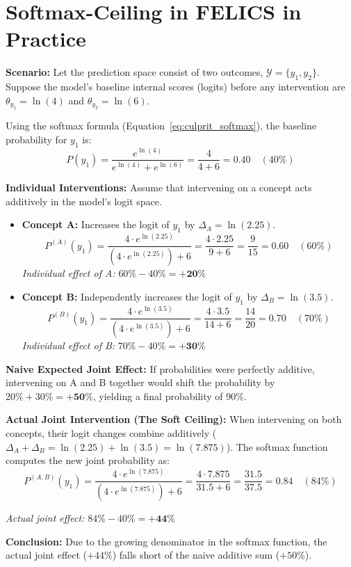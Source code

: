 \section*{Softmax-Ceiling in FELICS in Practice}
\begin{example_box}[label=ex:softmax_ceiling_unused]
    \textbf{Scenario:} Let the prediction space consist of two outcomes, $\mathcal{Y} = \{y_1, y_2\}$. Suppose the model's baseline internal scores (logits) before any intervention are $\theta_{y_1} = \ln(4)$ and $\theta_{y_2} = \ln(6)$.

    Using the softmax formula (Equation~\ref{eq:culprit_softmax}), the baseline probability for $y_1$ is:
    \begin{equation} P(y_1) = \frac{e^{\ln(4)}}{e^{\ln(4)} + e^{\ln(6)}} = \frac{4}{4 + 6} = 0.40 \quad (40\%) \end{equation}

    \smallskip
    \textbf{Individual Interventions:}
    Assume that intervening on a concept acts additively in the model's logit space.
    \begin{itemize}
        \item \textbf{Concept A:} Increases the logit of $y_1$ by $\Delta_A = \ln(2.25)$.
              \begin{equation} P^{(A)}(y_1) = \frac{4 \cdot e^{\ln(2.25)}}{(4 \cdot e^{\ln(2.25)}) + 6} = \frac{4 \cdot 2.25}{9 + 6} = \frac{9}{15} = 0.60 \quad (60\%) \end{equation}
              \emph{Individual effect of A:} $60\% - 40\% = \mathbf{+20\%}$

        \item \textbf{Concept B:} Independently increases the logit of $y_1$ by $\Delta_B = \ln(3.5)$.
              \begin{equation} P^{(B)}(y_1) = \frac{4 \cdot e^{\ln(3.5)}}{(4 \cdot e^{\ln(3.5)}) + 6} = \frac{4 \cdot 3.5}{14 + 6} = \frac{14}{20} = 0.70 \quad (70\%) \end{equation}
              \emph{Individual effect of B:} $70\% - 40\% = \mathbf{+30\%}$
    \end{itemize}

    \smallskip
    \textbf{Naive Expected Joint Effect:} If probabilities were perfectly additive, intervening on A and B together would shift the probability by $20\% + 30\% = \mathbf{+50\%}$, yielding a final probability of $90\%$.

    \smallskip
    \textbf{Actual Joint Intervention (The Soft Ceiling):}
    When intervening on both concepts, their logit changes combine additively ($\Delta_A + \Delta_B = \ln(2.25) + \ln(3.5) = \ln(7.875)$). The softmax function computes the new joint probability as:
    \begin{equation} P^{(A,B)}(y_1) = \frac{4 \cdot e^{\ln(7.875)}}{(4 \cdot e^{\ln(7.875)}) + 6} = \frac{4 \cdot 7.875}{31.5 + 6} = \frac{31.5}{37.5} = 0.84 \quad (84\%) \end{equation}

    \smallskip
    \emph{Actual joint effect:} $84\% - 40\% = \mathbf{+44\%}$

    \smallskip
    \textbf{Conclusion:} Due to the growing denominator in the softmax function, the actual joint effect ($+44\%$) falls short of the naive additive sum ($+50\%$).
\end{example_box}
